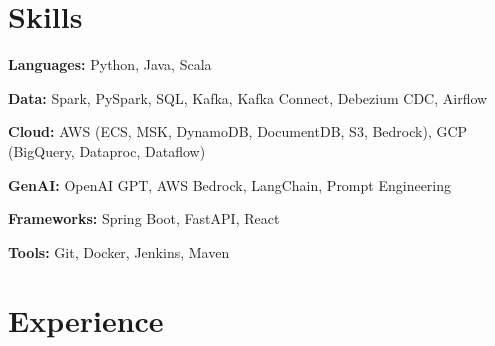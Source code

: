 \documentclass[letterpaper,10pt]{article}
\begin{document}

\section{Skills}
\begin{itemize}[leftmargin=0.15in, label={}, itemsep=-2pt]
{
    \item{\textbf{Languages:} Python, Java, Scala}
    \item{\textbf{Data:} Spark, PySpark, SQL, Kafka, Kafka Connect, Debezium CDC, Airflow}
    \item{\textbf{Cloud:} AWS (ECS, MSK, DynamoDB, DocumentDB, S3, Bedrock), GCP (BigQuery, Dataproc, Dataflow)}
    \item{\textbf{GenAI:} OpenAI GPT, AWS Bedrock, LangChain, Prompt Engineering}
    \item{\textbf{Frameworks:} Spring Boot, FastAPI, React}
    \item{\textbf{Tools:} Git, Docker, Jenkins, Maven}
}
\end{itemize}

\vspace{5pt}

\section{Experience}
\end{document}
